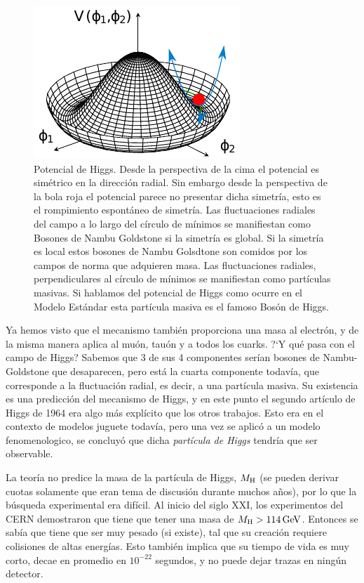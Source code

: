 \begin{figure}
	\begin{center}
	\includegraphics[scale=2]{images/higgspotential.pdf}
	\end{center}
	\caption{Potencial de Higgs. Desde la perspectiva de la cima el potencial es sim\'etrico en la direcci\'on radial. Sin embargo desde la perspectiva de la bola roja el potencial parece no presentar dicha simetr\'ia, esto es el rompimiento espont\'aneo de simetr\'ia. Las fluctuaciones radiales del campo a lo largo del c\'irculo de m\'inimos se manifiestan como Bosones de Nambu Goldstone si la simetr\'ia es global. Si la simetr\'ia es local estos bosones de Nambu Golsdtone son comidos por los campos de norma que adquieren masa. Las fluctuaciones radiales, perpendiculares al c\'irculo de m\'inimos se manifiestan como part\'iculas masivas. Si hablamos del potencial de Higgs como ocurre en el Modelo Est\'andar esta part\'icula masiva es el famoso Bos\'on de Higgs.}
\end{figure}




Ya hemos visto que el mecanismo tambi\'en proporciona una masa al
electr\'on, y de la misma manera aplica al mu\'on, tau\'on y a
todos los cuarks. ?`Y qu\'e pasa con el campo de Higgs?
Sabemos que 3 de sus 4 componentes ser\'ian bosones de
Nambu-Goldstone que desaparecen, pero est\'a la cuarta componente
todav\'ia, que corresponde a la fluctuaci\'on radial, es decir,
a una part\'icula masiva. Su existencia es una predicci\'on del
mecanismo de Higgs, y en este punto el segundo art\'iculo de Higgs
de 1964 era algo m\'as expl\'icito que los otros trabajos. Esto
era en el contexto de modelos juguete todav\'ia, pero una vez se
aplic\'o a un modelo fenomenologico, se concluy\'o que dicha
{\em part\'icula de Higgs} tendr\'ia que ser observable. 

La teor\'ia no predice la masa de la part\'icula de Higgs, $M_{\rm H}$
(se pueden derivar cuotas solamente que eran tema de discusi\'on durante
muchos a\~nos), por lo que la b\'usqueda experimental era dif\'icil.
Al inicio del siglo XXI, los experimentos del CERN demostraron
que tiene que tener una masa de $M_{\rm H} > 114\, {\rm GeV}$. Entonces se
sab\'ia que tiene que ser muy pesado (si existe), tal que su creaci\'on
requiere colisiones de altas energ\'ias. Esto tambi\'en implica que
su tiempo de vida es muy corto, decae en promedio en $10^{-22}$
segundos, y no puede dejar trazas en ning\'un detector.

